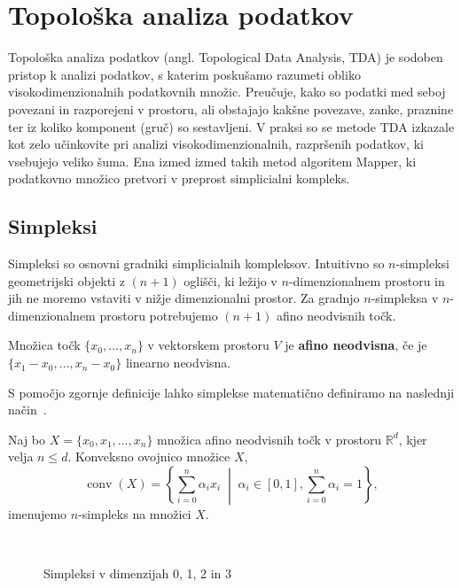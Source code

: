 \chapter{Topološka analiza podatkov}

Topološka analiza podatkov (angl. Topological Data Analysis, TDA) je sodoben pristop k analizi podatkov, s katerim poskušamo razumeti obliko visokodimenzionalnih podatkovnih množic. Preučuje, kako so podatki med seboj povezani in razporejeni v prostoru, ali obstajajo kakšne povezave, zanke, praznine ter iz koliko komponent (gruč) so sestavljeni.
V praksi so se metode TDA izkazale kot zelo učinkovite pri analizi visokodimenzionalnih, razpršenih podatkov, ki vsebujejo veliko šuma. Ena izmed izmed takih metod algoritem Mapper, ki podatkovno množico pretvori v preprost simplicialni kompleks.

\section{Simpleksi}

Simpleksi so osnovni gradniki simplicialnih kompleksov. Intuitivno so $n$-simpleksi geometrijski objekti z $(n + 1)$ oglišči, ki ležijo v $n$-dimenzionalnem prostoru in jih ne moremo vstaviti v nižje dimenzionalni prostor. Za gradnjo $n$-simpleksa v $n$-dimenzionalnem prostoru potrebujemo $(n + 1)$ afino neodvisnih točk.

\begin{definicija}
    Množica točk $\{x_0, \dots, x_n\}$ v vektorskem prostoru $V$ je \textbf{afino neodvisna}, če je $\{x_1 - x_0, \dots, x_n - x_0\}$ linearno neodvisna.
\end{definicija}

S pomočjo zgornje definicije lahko simplekse matematično definiramo na naslednji način~\cite{Munkers84}.

\begin{definicija}
Naj bo \(X = \{x_0, x_1, \dots, x_n\}\) množica afino neodvisnih točk v prostoru \(\mathbb{R}^d\), kjer velja \(n \leq d\). Konveksno ovojnico množice \(X\),
\[
\operatorname{conv}(X) = \left\{ \sum_{i=0}^n \alpha_i x_i \;\middle|\; \alpha_i \in [0,1], \sum_{i=0}^n \alpha_i = 1 \right\},
\]
imenujemo \(n\)-simpleks na množici \(X\).
\end{definicija}

\begin{figure}[H]
  \centering
  
  \caption{Simpleksi v dimenzijah 0, 1, 2 in 3}~\label{fig:basic-simplices}
\end{figure}

